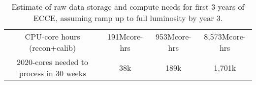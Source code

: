 \begin{table*}[ht]
\begin{tabular}{c|c|c|c}
        CPU-core hours (recon+calib)	& 191Mcore-hrs	& 953Mcore-hrs &	8,573Mcore-hrs \\
        2020-cores needed to process in 30 weeks	& 38k &	189k &	1,701k \\
        \hline
   \end{tabular}
    \caption{Estimate of raw data storage and compute needs for first 3 years of ECCE,  assuming ramp up to full luminosity by year 3. 
    }
    \label{tab:computing-integrated_luminosity_by_year}
\end{table*}
